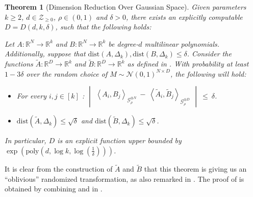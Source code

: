 \documentclass[11pt]{article}
\newcommand{\inparen}[1]{\left ( #1 \right )}
\newcommand{\inangle}[1]{\left \langle #1 \right \rangle}
\newcommand{\inabs}[1]{\begin{vmatrix} #1 \end{vmatrix}}
\newcommand{\wtilde}[1]{\widetilde{#1}}
\newcommand{\bbR}{{\mathbb R}}
\newcommand{\bX}{\mathbf{X}}
\newcommand{\calG}{\mathcal{G}}
\newcommand{\calN}{\mathcal{N}}
\newcommand{\calZ}{\mathcal{Z}}
\newcommand{\poly}{\mathrm{poly}}
\newtheorem{theorem}{Theorem}[section]
\begin{document}
\begin{theorem}[Dimension Reduction Over Gaussian Space]\label{th:dim_red_Gauss_space}
	Given parameters $k \ge 2$, $d \in \calZ_{\ge 0}$, $\rho \in (0,1)$ and $\delta > 0$, there exists an \emph{explicitly computable} $D = D(d, k, \delta)$, such that the following holds:
	
	Let $A: \bbR^N \to \bbR^k$ and $B: \bbR^N \to \bbR^k$ be degree-$d$ multilinear polynomials. Additionally, suppose that $\mathrm{dist}(A, \Delta_k), \mathrm{dist}(B, \Delta_k) \le \delta$. Consider the functions $\wtilde{A} : \bbR^D \to \bbR^k$ and $\wtilde{B} : \bbR^D \to \bbR^k$ as defined in . With {\em probability} at least $1-3\delta$ over the random choice of $M \sim \calN(0,1)^{N \times D}$, the following will hold:
	\begin{itemize}
		\item For every $i, j \in [k]$ : $\inabs{\inangle{A_i, B_j}_{\calG_\rho^{\otimes N}} ~-~ \inangle{\wtilde{A}_i, \wtilde{B}_j}_{\calG_\rho^{\otimes D}}} ~\le~ \delta$.
		\item $\mathrm{dist}(\wtilde{A}, \Delta_k) \le \sqrt{\delta}$ and $\mathrm{dist}(\wtilde{B}, \Delta_k) \le \sqrt{\delta}$.
	\end{itemize}
	In particular, $D$ is an explicit function upper bounded by $\exp\inparen{\poly\inparen{d, \log k, \log(\frac{1}{\delta})}}$.
\end{theorem}

It is clear from the construction of $\wtilde{A}$ and $\wtilde{B}$ that this theorem is giving us an ``oblivious'' randomized transformation, as also remarked in . The proof of  is obtained by combining  and  in .
\end{document}
